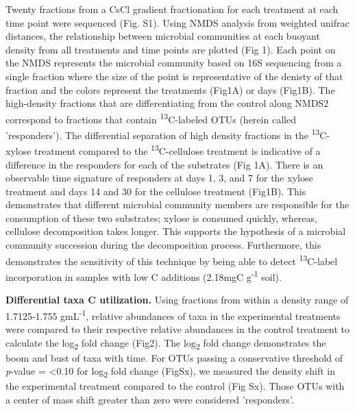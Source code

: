 Twenty fractions from a CsCl gradient fractionation for each treatment at each time point were sequenced (Fig. S1). Using NMDS analysis from weighted unifrac distances, the relationship between microbial communities at each buoyant density from all treatments and time points are plotted (Fig 1). Each point on the NMDS represents the microbial community based on 16S sequencing from a single fraction where the size of the point is representative of the denisty of that fraction and the colors represent the treatments (Fig1A) or days (Fig1B). The high-density fractions that are differentiating from the control along NMDS2 correspond to fractions that contain \textsuperscript{13}C-labeled OTUs (herein called 'responders'). The differential separation of high density fractions in the \textsuperscript{13}C-xylose treatment compared to the \textsuperscript{13}C-cellulose treatment is indicative of a difference in the responders for each of the substrates (Fig 1A). There is an observable time signature of responders at days 1, 3, and 7 for the xylose treatment and days 14 and 30 for the cellulose treatment (Fig1B). This demonstrates that different microbial community members are responsible for the consumption of these two substrates; xylose is consumed quickly, whereas, cellulose decomposition takes longer. This supports the hypothesis of a microbial community succession during the decomposition process. Furthermore, this demonstrates the sensitivity of this technique by being able to detect \textsuperscript{13}C-label incorporation in samples with low C additions (2.18mgC g\textsuperscript{-1} soil).    

\textbf{Differential taxa C utilization.} Using fractions from within a density range of 1.7125-1.755 gmL\textsuperscript{-1}, relative abundances of taxa in the experimental treatments were compared to their respective relative abundances in the control treatment to calculate the log\textsubscript{2} fold change (Fig2). The log\textsubscript{2} fold change demonstrates the boom and bust of taxa with time. For OTUs passing a conservative threshold of \textit{p}-value = <0.10 for log\textsubscript{2} fold change (FigSx), we measured the density shift in the experimental treatment compared to the control (Fig Sx).  Those OTUs with a center of mass shift greater than zero were considered 'responders'.   

